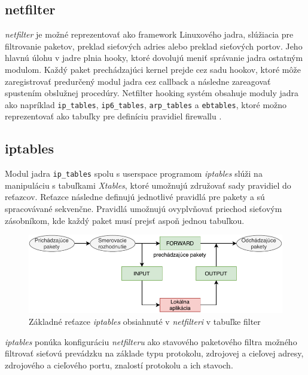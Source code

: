 \subsection{netfilter}
\emph{netfilter} je možné reprezentovať ako framework Linuxového jadra, slúžiacia pre filtrovanie paketov, preklad sieťových adries alebo preklad sieťových portov. Jeho hlavnú úlohu v jadre plnia hooky, ktoré dovolujú meniť správanie jadra ostatným modulom. Každý paket prechádzajúci kernel prejde cez sadu hookov, ktoré môže zaregistrovať predurčený modul jadra cez callback a následne zareagovať spustením obslužnej procedúry. Netfilter hooking systém obsahuje moduly jadra ako napríklad \texttt{ip\_tables}, \texttt{ip6\_tables}, \texttt{arp\_tables} a \texttt{ebtables}, ktoré možno reprezentovať ako tabuľky pre definíciu pravidiel firewallu \cite{netfilter, manpages}. 

\subsection{iptables}
Modul jadra \texttt{ip\_tables} spolu s userspace programom \emph{iptables} slúži na manipuláciu s tabuľkami \emph{Xtables}, ktoré umožnujú združovať sady pravidiel do reťazcov. Reťazce následne definujú jednotlivé pravidlá pre pakety a sú spracovávané sekvenčne. Pravidlá umožnujú ovyplvňovať priechod sieťovým zásobníkom, kde každý paket musí prejsť aspoň jednou tabuľkou.
\cite{iptables_le, netfilter, manpages}
\begin{figure}[h]
	\centering
	\label{iptables}
	\includegraphics[scale=1.07]{obrazky-figures/iptables.pdf}
	\caption{Základné reťazce \emph{iptables} obsiahnuté v \emph{netfilteri} v tabuľke filter}
\end{figure}
                                                                                              
\emph{iptables} ponúka konfiguráciu \emph{netfilteru} ako stavového paketového filtra možného filtrovať sieťovú prevádzku na základe typu protokolu, zdrojovej a cieľovej adresy, zdrojového a cieľového portu, znalostí protokolu a ich stavoch. 

